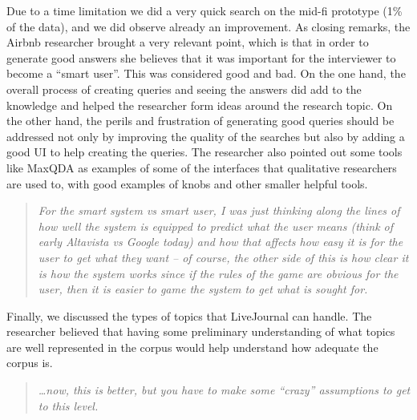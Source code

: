 \documentclass{sigchi}
\begin{document}
Due to a time limitation we did a very quick search on the mid-fi prototype (1\% of the data), and we did observe already an improvement. As closing remarks, the Airbnb researcher brought a very relevant point, which is that in order to generate good answers she believes that it was important for the interviewer to become a ``smart user''. 
This was considered good and bad. On the one hand, the overall process of creating queries and seeing the answers did add to the knowledge and helped the researcher form ideas around the research topic. On the other hand, the perils and frustration of generating good queries should be addressed not only by improving the quality of the searches but also by adding a good UI to help creating the queries. The researcher also pointed out some tools like MaxQDA \cite{maxqda:2007} as examples of some of the interfaces that qualitative researchers are used to, with good examples of knobs and other smaller helpful tools. 

\begin{quote}
{\em
For the smart system vs smart user, I was just thinking along the lines of how well the system is equipped to predict what the user means (think of early Altavista vs Google today) and how that affects how easy it is for the user to get what they want -- of course, the other side of this is how clear it is how the system works since if the rules of the game are obvious for the user, then it is easier to game the system to get what is sought for.
}\end{quote}

Finally, we discussed the types of topics that LiveJournal can handle. The researcher believed that having some preliminary understanding of what topics are well represented in the corpus would help understand how adequate the corpus is. 

\begin{quote}
{\em
\dots now, this is better, but you have to make some ``crazy'' assumptions to get to this level.
}\end{quote}

\end{document}
